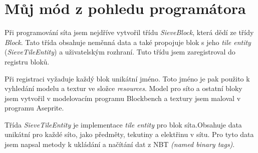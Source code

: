 \documentclass[FM,Proj,bw]{tulthesis}
\begin{document}
\chapter{Můj mód z pohledu programátora}
\begin{comment}
    V této kapitole jsem popsal veškerý třídy které jsem napsal abych přidal síto do do hry.
\end{comment}
\par Při programování síta jsem nejdříve vytvořil třídu \textit{SieveBlock}, která dědí ze třídy \textit{Block}. Tato třída obsahuje neměnná data a také propojuje blok s jeho\textit{ tile entity} (\textit{SieveTileEntity}) a uživatelským rozhraní. Tuto třídu jsem zaregistroval do registru bloků.
\par Při registraci vyžaduje každý blok unikátní jméno. Toto jméno je pak použito k vyhledání modelu a textur ve složce \textit{resources}. Model pro síto a ostatní bloky jsem vytvořil v modelovacím programu Blockbench a textury jsem maloval v programu Aseprite.
\begin{comment}
   dopsat něco o modelu. něco jako tohle =>

    \par    Začal jsem tím že jsem do hry přidal blok pro sivku. Nejprve jsem vytvořil třídu pro blok která dědí ze třídy  \textit{Block}. Poté jsem  registroval objekt s touto třídou do registru bloků. Registrace vyžaduje jméno pro tento objekt a  konstruktor třídy \textit{Block}. Podle jména hra pak vyhledává stejnojmenné soubory v podsložkách \textit{resources}.  Pro blok je potřeba přidat soubor do složek : \textit{blockstates}, \textit{models} a \textit{textures}. Do složky \textit{blockstates} přidám JSON soubor který obsahuje, který model má být použit v závislosti na proměnných v \textit{blockstate}.  Do složky model přidám JSON soubor, který obsahuje model bloku a odkaz na jeho textury. Soubor také může dědit z ostatních souborů, pomocí parametru \textit{parent}. Pro model krychle je zde před připravený soubor \textit{cube_all}. Ve složce \textit{textures} se nacházejí všechny textury.

    Tímto jsem přidal do hry blok, ten ale nemá žádné funkce.

     \par   Pro upravení modelu bloku je potřeba přepsat metodu \textit{getShape} ve třídě bloku, aby vracela model sestavený z kvádrů a také upravit soubor ve složce \textit{models}. K vytvoření modelů pro moje blocky jsem použil program \textit{Blockbench}.
\end{comment}
\par Třída \textit{SieveTileEntity} je implementace\textit{ tile entity} pro blok síta.Obsahuje data unikátní pro každé síto, jako předměty, tekutiny a elektřinu v sítu. Pro tyto data jsem napsal metody k ukládání a načítání dat z NBT\textit{ (named binary tags)}. 
\end{document}

